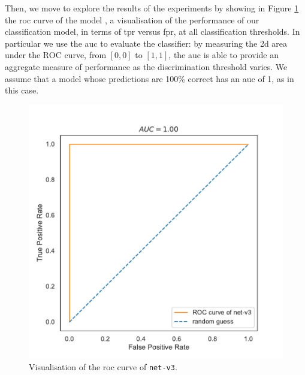 Then, we move to explore the results of the experiments by showing in Figure 
\ref{fig:net-v3auc} the \gls{roc} curve of the model 
\cite[see][]{fawcett2006introduction}, a visualisation of the performance of our 
classification model, in terms of \gls{tpr} versus \gls{fpr}, at all classification 
thresholds.
In particular we use the \gls{auc} to evaluate the classifier: by measuring the 
\gls{2d} area under the ROC curve, from $[0, 0]$ to $[1, 1]$, the \gls{auc} is able 
to provide an aggregate measure of performance as the discrimination threshold 
varies.
We assume that a model whose predictions are 100\% correct has an \gls{auc} of 
1, as in this case.
\begin{figure}[!htb]
	\centering
	\includegraphics[width=.5\textwidth]{contents/images/net-v3/roc-net-v3(a)}%
	\caption[Evaluation of the \gls{roc} of \texttt{net-v3}.]{Visualisation of the 
		\gls{roc} curve of \texttt{net-v3}.}
	\label{fig:net-v3auc}
\end{figure}



